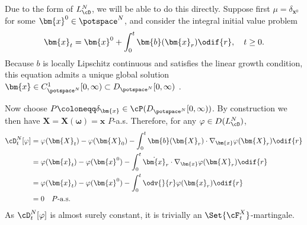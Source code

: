 Due to the form of $L_{\cD}^N$, we will be able to do this directly.
Suppose first $\mu = \delta_{\bm{x}^0}$ for some $\bm{x}^0 \in \potspace^N$, and consider the integral initial value problem
\begin{equation}
  \bm{x}_t = \bm{x}^0 + \int_0^t \bm{b}(\bm{x}_r) \odif{r}, \quad t \geq 0.
\end{equation}
Because $b$ is locally Lipschitz continuous and satisfies the linear growth condition, this equation admits a unique global solution $\bm{x} \in C^1_{\potspace^N}[0,\infty) \subset D_{\potspace^N}[0,\infty)$ \cite{ode_result}.

Now choose $P \coloneqq \delta_{\bm{x}} \in \cP(D_{\potspace^N}[0,\infty))$.
By construction we then have $\bm{X} = \bm{X}(\bm{\omega}) = \bm{x}$ $P$-a.s.
Therefore, for any $\varphi \in D(L_{\cD}^N)$,
\begin{equation}
  \begin{split}
    \cD_t^{N}[\varphi] & = \varphi(\bm{X}_t) - \varphi(\bm{X}_0) - \int_0^t \bm{b}(\bm{X}_r) \cdot \nabla_{\bm{x}} \varphi(\bm{X}_r) \odif{r} \\
                       & = \varphi(\bm{x}_t) - \varphi(\bm{x}^0) - \int_0^t \dot{\bm{x}}_r \cdot \nabla_{\bm{x}} \varphi(\bm{X}_r) \odif{r}   \\
                       & = \varphi(\bm{x}_t) - \varphi(\bm{x}^0) - \int_0^t \odv{}{r} \varphi(\bm{x}_r) \odif{r}                              \\
                       & = 0 \quad P\text{-a.s.}
  \end{split}
\end{equation}
As $\cD_t^{N}[\varphi]$ is almost surely constant, it is trivially an $\Set{\cF_t^X}$-martingale.

